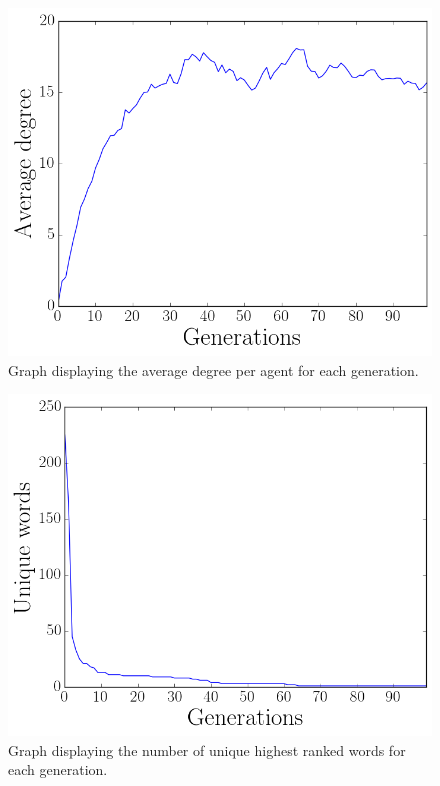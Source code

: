 \begin{figure}[htbp]
    \centering
    \includegraphics[scale=0.5]{fig/Results/Exp4/Degree1}
    \caption{Graph displaying the average degree per agent for each generation.}
    \label{fig:Degree4}
\end{figure}
\begin{figure}[htbp]
    \centering
    \includegraphics[scale=0.5]{fig/Results/Exp4/UniqueWords1}
    \caption{Graph displaying the number of unique highest ranked words for each generation.}
    \label{fig:UniqueWords4}
\end{figure}
